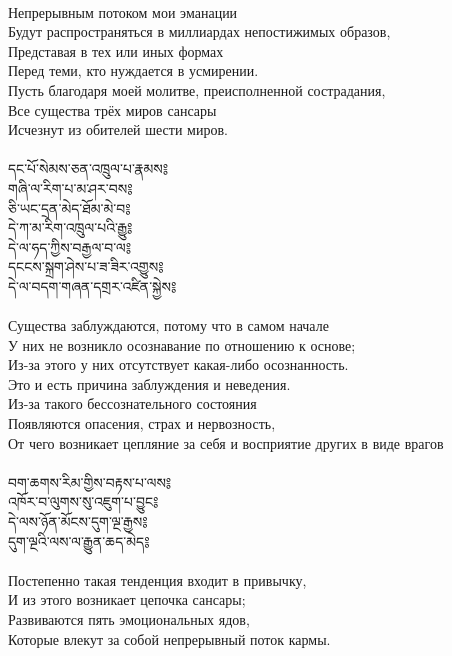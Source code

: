 \\
Непрерывным потоком мои эманации\\
Будут распространяться в миллиардах непостижимых образов, \\
Представая в тех или иных формах\\
Перед теми, кто нуждается в усмирении.\\
Пусть благодаря моей молитве, преисполненной сострадания,\\
Все существа трёх миров сансары\\
Исчезнут из обителей шести миров.\\
\\
\newpage
{\ti
དང་པོ་སེམས་ཅན་འཁྲུལ་པ་རྣམས༔ \\
གཞི་ལ་རིག་པ་མ་ཤར་བས༔ \\
ཅི་ཡང་དྲན་མེད་ཐོམ་མེ་བ༔ \\
དེ་ཀ་མ་རིག་འཁྲུལ་པའི་རྒྱུ༔ \\
དེ་ལ་ཧད་ཀྱིས་བརྒྱལ་བ་ལ༔ \\
དངངས་སྐྲག་ཤེས་པ་ཟ་ཟིར་འགྱུས༔ \\
དེ་ལ་བདག་གཞན་དགྲར་འཛིན་སྐྱེས༔}\\
\\
Существа заблуждаются, потому что в самом начале \\
У них не возникло осознавание по отношению к основе; \\
Из-за этого у них отсутствует какая-либо осознанность.\\
Это и есть причина заблуждения и неведения.\\
Из-за такого бессознательного состояния\\
Появляются опасения, страх и нервозность,\\
От чего возникает цепляние за себя и восприятие других в виде врагов\\
\\
{\ti
བག་ཆགས་རིམ་གྱིས་བརྟས་པ་ལས༔ \\
འཁོར་བ་ལུགས་སུ་འཇུག་པ་བྱུང༔ \\
དེ་ལས་ཉོན་མོངས་དུག་ལྔ་རྒྱས༔ \\
དུག་ལྔའི་ལས་ལ་རྒྱུན་ཆད་མེད༔}\\
\\
Постепенно такая тенденция входит в привычку, \\
И из этого возникает цепочка сансары; \\
Развиваются пять эмоциональных ядов, \\
Которые влекут за собой непрерывный поток кармы.\\
\\
